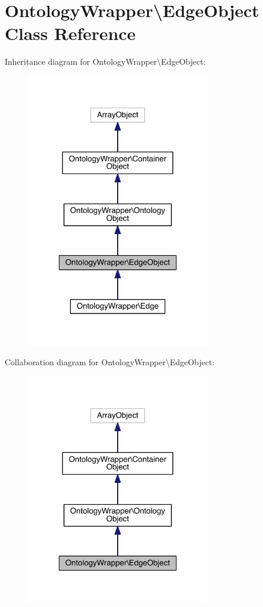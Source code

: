 \hypertarget{class_ontology_wrapper_1_1_edge_object}{\section{Ontology\-Wrapper\textbackslash{}Edge\-Object Class Reference}
\label{class_ontology_wrapper_1_1_edge_object}
}


Inheritance diagram for Ontology\-Wrapper\textbackslash{}Edge\-Object\-:
\nopagebreak
\begin{figure}[H]
\begin{center}
\leavevmode
\includegraphics[width=228pt]{class_ontology_wrapper_1_1_edge_object__inherit__graph}
\end{center}
\end{figure}


Collaboration diagram for Ontology\-Wrapper\textbackslash{}Edge\-Object\-:
\nopagebreak
\begin{figure}[H]
\begin{center}
\leavevmode
\includegraphics[width=228pt]{class_ontology_wrapper_1_1_edge_object__coll__graph}
\end{center}
\end{figure}
